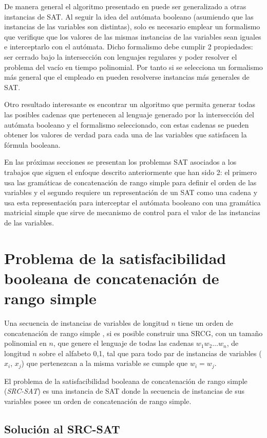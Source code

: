 \documentclass[12pt]{article}
\begin{document}
De manera general el algoritmo presentado en \cite{aCFSAT} puede ser generalizado a otras instancias de SAT. 
Al seguir la idea del autómata booleano (asumiendo que las instancias de las variables son distintas), solo es 
necesario emplear un formalismo que verifique que los valores de las mismas instancias de las variables sean 
iguales e interceptarlo con el autómata. Dicho formalismo debe cumplir 2 propiedades: ser cerrado bajo la intersección con lenguajes regulares y poder resolver el problema del vacío en tiempo polinomial. Por tanto si se selecciona un formalismo más general que el empleado en \cite{aCFSAT} pueden resolverse instancias más generales de SAT.

Otro resultado interesante es encontrar un algoritmo que permita generar todas las posibles cadenas que pertenecen al lenguaje generado por la intersección del autómata booleano y el formalismo seleccionado, con estas cadenas se pueden obtener los valores de verdad para cada una de las variables que satisfacen la fórmula booleana.

En las próximas secciones se presentan los problemas SAT asociados a los trabajos que siguen el enfoque 
descrito anteriormente que han sido 2: el primero usa las gramáticas de concatenación de rango simple 
para definir el orden de las variables y el segundo requiere un representación de un SAT como una 
cadena y usa esta representación para interceptar el autómata booleano con una gramática matricial 
simple que sirve de mecanismo de control para el valor de las instancias de las variables.
\section{Problema de la satisfacibilidad booleana de concatenación de rango simple}

Una secuencia de instancias de variables de longitud $n$ tiene un orden de concatenación de rango simple \cite{aSRCSAT}, 
si es posible construir una SRCG, con un tamaño polinomial en $n$, que genere el lenguaje de todas las cadenas 
$w_1w_2 \ldots w_n$, de longitud $n$ sobre el alfabeto {0,1}, tal que para todo par de instancias de variables 
($x_i$, $x_j$) que pertenezcan a la misma variable se cumple que $w_i = w_j$.

El problema de la satisfacibilidad booleana de concatenación de rango simple (\textit{SRC-SAT}) es una instancia de
SAT donde la secuencia de instancias de sus variables posee un orden de concatenación de rango simple.

\subsection{Solución al SRC-SAT}
\end{document}
